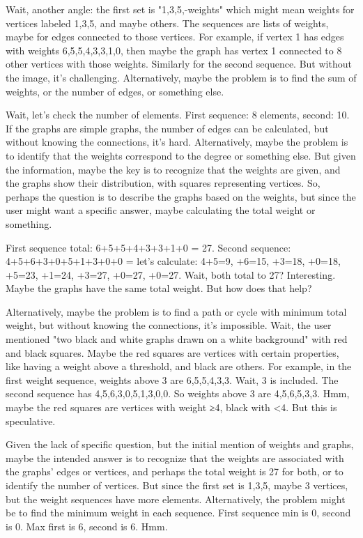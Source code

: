 Wait, another angle: the first set is "{1,3,5,}-weights" which might mean weights for vertices labeled 1,3,5, and maybe others. The sequences are lists of weights, maybe for edges connected to those vertices. For example, if vertex 1 has edges with weights 6,5,5,4,3,3,1,0, then maybe the graph has vertex 1 connected to 8 other vertices with those weights. Similarly for the second sequence. But without the image, it's challenging. Alternatively, maybe the problem is to find the sum of weights, or the number of edges, or something else.

Wait, let's check the number of elements. First sequence: 8 elements, second: 10. If the graphs are simple graphs, the number of edges can be calculated, but without knowing the connections, it's hard. Alternatively, maybe the problem is to identify that the weights correspond to the degree or something else. But given the information, maybe the key is to recognize that the weights are given, and the graphs show their distribution, with squares representing vertices. So, perhaps the question is to describe the graphs based on the weights, but since the user might want a specific answer, maybe calculating the total weight or something.

First sequence total: 6+5+5+4+3+3+1+0 = 27. Second sequence: 4+5+6+3+0+5+1+3+0+0 = let's calculate: 4+5=9, +6=15, +3=18, +0=18, +5=23, +1=24, +3=27, +0=27, +0=27. Wait, both total to 27? Interesting. Maybe the graphs have the same total weight. But how does that help?

Alternatively, maybe the problem is to find a path or cycle with minimum total weight, but without knowing the connections, it's impossible. Wait, the user mentioned "two black and white graphs drawn on a white background" with red and black squares. Maybe the red squares are vertices with certain properties, like having a weight above a threshold, and black are others. For example, in the first weight sequence, weights above 3 are 6,5,5,4,3,3. Wait, 3 is included. The second sequence has 4,5,6,3,0,5,1,3,0,0. So weights above 3 are 4,5,6,5,3,3. Hmm, maybe the red squares are vertices with weight ≥4, black with <4. But this is speculative.

Given the lack of specific question, but the initial mention of weights and graphs, maybe the intended answer is to recognize that the weights are associated with the graphs' edges or vertices, and perhaps the total weight is 27 for both, or to identify the number of vertices. But since the first set is {1,3,5}, maybe 3 vertices, but the weight sequences have more elements. Alternatively, the problem might be to find the minimum weight in each sequence. First sequence min is 0, second is 0. Max first is 6, second is 6. Hmm.

